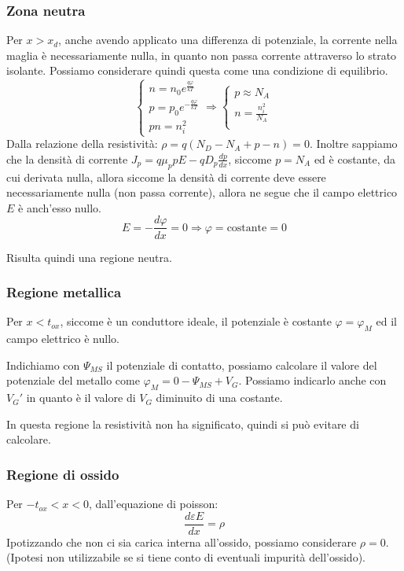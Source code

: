 \documentclass[../template]{subfiles}
\begin{document}

\subsubsection{Zona neutra}
Per $x > x_d$, anche avendo applicato una differenza di potenziale, la corrente nella maglia è necessariamente nulla, in quanto non passa corrente attraverso lo strato isolante. Possiamo considerare quindi questa come una condizione di equilibrio.
\[
    \begin{cases}
        n = n_0 e^\frac{q \varphi}{kT}\\
        p = p_0 e^{-\frac{q \varphi}{kT}}\\
        pn = n_i^2
    \end{cases} \Rightarrow
    \begin{cases}
        p \approx N_A\\
        n = \frac{n_i^2}{N_A}\\
    \end{cases}
\]
Dalla relazione della resistività: $\rho = q (N_D - N_A + p - n) = 0$.
Inoltre sappiamo che la densità di corrente $J_p = q \mu_p p E - q D_p \frac{dp}{dx}$, siccome $p = N_A$ ed è costante, da cui derivata nulla, allora siccome la densità di corrente deve essere necessariamente nulla (non passa corrente), allora ne segue che il campo elettrico $E$ è anch'esso nullo.
\[
    E = -\frac{d \varphi}{dx} = 0 \Rightarrow \varphi = \text{costante} = 0
\]

Risulta quindi una regione neutra.
\subsubsection{Regione metallica}
Per $x < t_{ox}$, siccome è un conduttore ideale, il potenziale è costante $\varphi = \varphi_M$ ed il campo elettrico è nullo.

Indichiamo con $\Psi_{MS}$ il potenziale di contatto, possiamo calcolare il valore del potenziale del metallo come $\varphi_M = 0 - \Psi_{MS} + V_G$. Possiamo indicarlo anche con $V_G'$ in quanto è il valore di $V_G$ diminuito di una costante.

In questa regione la resistività non ha significato, quindi si può evitare di calcolare.

\subsubsection{Regione di ossido}
Per $-t_{ox} < x < 0$, dall'equazione di poisson:
\[
    \frac{d\varepsilon E}{dx} = \rho
\]
Ipotizzando che non ci sia carica interna all'ossido, possiamo considerare $\rho = 0$. (Ipotesi non utilizzabile se si tiene conto di eventuali impurità dell'ossido).
\end{document}
